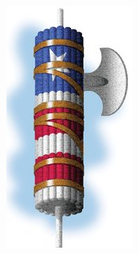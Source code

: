 \begin{frame}
    \centering
    \includegraphics[height=.8\textheight]{img/fasces/flag-fasces.jpg} \\
\end{frame}


